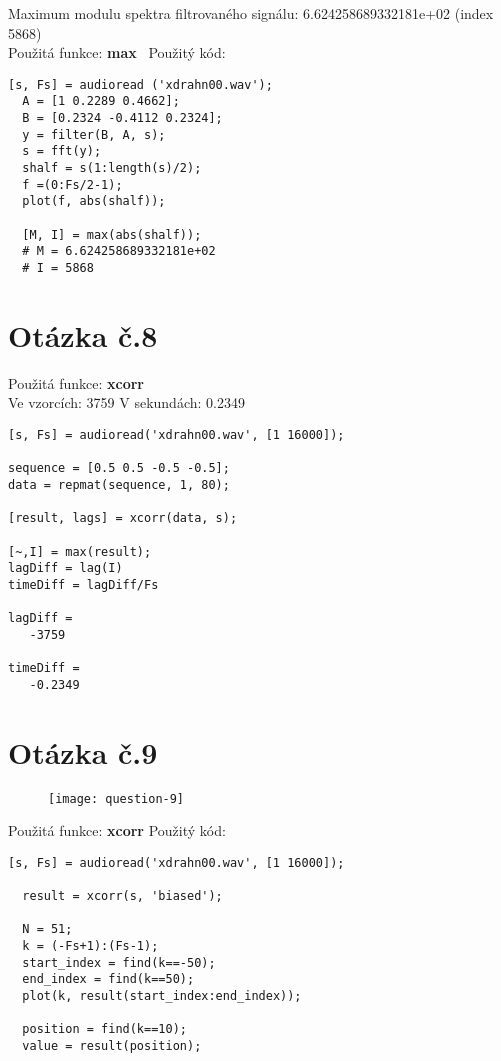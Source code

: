 \documentclass[a4paper,11pt]{article}
\begin{document}
Maximum modulu spektra filtrovaného signálu: 6.624258689332181e+02 (index 5868)\\
\newline
Použitá funkce: \textbf{max}\
\newline
\newline
Použitý kód:
\lstset{language=Matlab}
\begin{lstlisting}[frame=single,breaklines]
  [s, Fs] = audioread ('xdrahn00.wav');
  A = [1 0.2289 0.4662];
  B = [0.2324 -0.4112 0.2324];
  y = filter(B, A, s);
  s = fft(y);
  shalf = s(1:length(s)/2);
  f =(0:Fs/2-1);
  plot(f, abs(shalf));

  [M, I] = max(abs(shalf));
  # M = 6.624258689332181e+02
  # I = 5868
\end{lstlisting}

\section{Otázka č.8}

Použitá funkce: \textbf{xcorr}\\
\newline
Ve vzorcích: 3759
\newline
V sekundách: 0.2349
\newline

\lstset{language=Matlab}
\begin{lstlisting}[frame=single,breaklines]
[s, Fs] = audioread('xdrahn00.wav', [1 16000]);

sequence = [0.5 0.5 -0.5 -0.5];
data = repmat(sequence, 1, 80);

[result, lags] = xcorr(data, s);

[~,I] = max(result);
lagDiff = lag(I)
timeDiff = lagDiff/Fs

lagDiff =
   -3759

timeDiff =
   -0.2349

\end{lstlisting}

\section{Otázka č.9}

\begin{figure}[H]
  \centering
  \texttt{[image: question-9]}
\end{figure}

Použitá funkce: \textbf{xcorr}
\newline
\newline
Použitý kód:
\lstset{language=Matlab}
\begin{lstlisting}[frame=single,breaklines]
  [s, Fs] = audioread('xdrahn00.wav', [1 16000]);

  result = xcorr(s, 'biased');

  N = 51;
  k = (-Fs+1):(Fs-1);
  start_index = find(k==-50);
  end_index = find(k==50);
  plot(k, result(start_index:end_index));

  position = find(k==10);
  value = result(position);
\end{lstlisting}
\end{document}
